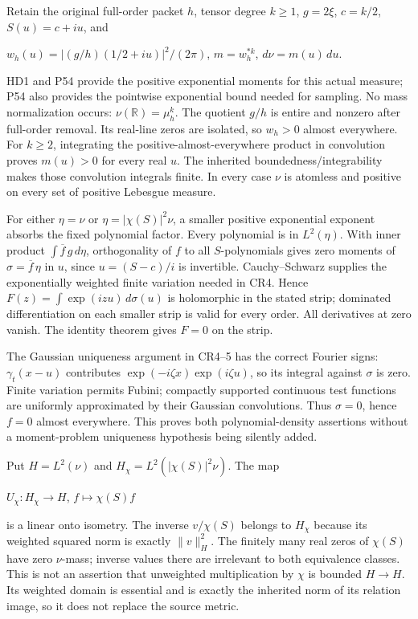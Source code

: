 Retain the original full-order packet \(h\), tensor degree \(k\ge1\), \(g=2\xi\), \(c=k/2\), \(S(u)=c+iu\), and

\(w_h(u)=|(g/h)(1/2+iu)|^2/(2\pi)\), \(m=w_h^{*k}\), \(d\nu=m(u)\,du\).

HD1 and P54 provide the positive exponential moments for this actual measure; P54 also provides the pointwise exponential bound needed for sampling. No mass normalization occurs: \(\nu(\mathbb R)=\mu_h^k\). The quotient \(g/h\) is entire and nonzero after full-order removal. Its real-line zeros are isolated, so \(w_h>0\) almost everywhere. For \(k\ge2\), integrating the positive-almost-everywhere product in convolution proves \(m(u)>0\) for every real \(u\). The inherited boundedness/integrability makes those convolution integrals finite. In every case \(\nu\) is atomless and positive on every set of positive Lebesgue measure.

For either \(\eta=\nu\) or \(\eta=|\chi(S)|^2\nu\), a smaller positive exponential exponent absorbs the fixed polynomial factor. Every polynomial is in \(L^2(\eta)\). With inner product \(\int\overline f\,g\,d\eta\), orthogonality of \(f\) to all \(S\)-polynomials gives zero moments of \(\sigma=\overline f\,\eta\) in \(u\), since \(u=(S-c)/i\) is invertible. Cauchy--Schwarz supplies the exponentially weighted finite variation needed in CR4. Hence \(F(z)=\int\exp(izu)\,d\sigma(u)\) is holomorphic in the stated strip; dominated differentiation on each smaller strip is valid for every order. All derivatives at zero vanish. The identity theorem gives \(F=0\) on the strip.

The Gaussian uniqueness argument in CR4--5 has the correct Fourier signs: \(\gamma_t(x-u)\) contributes \(\exp(-i\zeta x)\exp(i\zeta u)\), so its integral against \(\sigma\) is zero. Finite variation permits Fubini; compactly supported continuous test functions are uniformly approximated by their Gaussian convolutions. Thus \(\sigma=0\), hence \(f=0\) almost everywhere. This proves both polynomial-density assertions without a moment-problem uniqueness hypothesis being silently added.

Put \(H=L^2(\nu)\) and \(H_\chi=L^2(|\chi(S)|^2\nu)\). The map

\(U_\chi:H_\chi\longrightarrow H\), \(f\longmapsto\chi(S)f\)

is a linear onto isometry. The inverse \(v/\chi(S)\) belongs to \(H_\chi\) because its weighted squared norm is exactly \(\|v\|_H^2\). The finitely many real zeros of \(\chi(S)\) have zero \(\nu\)-mass; inverse values there are irrelevant to both equivalence classes. This is not an assertion that unweighted multiplication by \(\chi\) is bounded \(H\longrightarrow H\). Its weighted domain is essential and is exactly the inherited norm of its relation image, so it does not replace the source metric.

